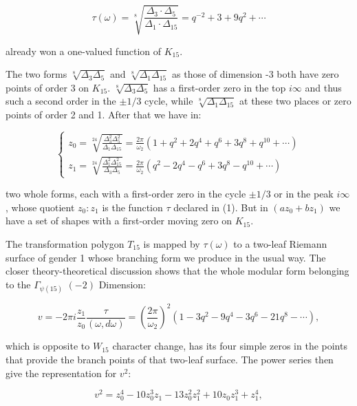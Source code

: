 \documentclass{article}
\begin{document}
\begin{equation}\label{1}
	\tau(\omega)=\sqrt[8]{\frac{\Delta_3\cdot\Delta_5}{\Delta_1\cdot\Delta_{15}}}=q^{-2}+3+9q^2+\cdots
\end{equation}

already won a one-valued function of $K_{15}$. 

The two forms $\sqrt[8]{\Delta_3\Delta_5}$ and $\sqrt[8]{\Delta_1\Delta_{15}}$ as those of dimension -3 both have zero points of order 3 on $K_{15}$. $\sqrt[8]{\Delta_3\Delta_5} $ has a first-order zero in the top $i\infty$ and thus such a second order in the $\pm1/3$ cycle, while $\sqrt[8]{\Delta_1\Delta_{15}}$ at these two places or zero points of order 2 and 1. After that we have in:

\begin{equation}\label{2}
	\begin{cases}
		z_0=\sqrt[24]{\frac{\Delta^2_3\Delta^2_5}{\Delta_1\Delta_{15}}}=\frac{2\pi}{\omega_2}(1+q^2+2q^4+q^6+3q^8+q^{10}+\cdots)\\
		z_1=\sqrt[24]{\frac{\Delta^2_1\Delta^2_{15}}{\Delta_3\Delta_{5}}}=\frac{2\pi}{\omega_2}(q^2-2q^4-q^6+3q^8-q^{10}+\cdots)
	\end{cases}
\end{equation}

two whole forms, each with a first-order zero in the cycle $\pm1/3$ or in the peak $i\infty $, whose quotient $z_0:z_1$ is the function $\tau $ declared in (1). But in $(az_0+bz_1)$ we have a set of shapes with a first-order moving zero on $K_{15}$. 

The transformation polygon $T_{15}$ is mapped by $\tau(\omega)$ to a two-leaf Riemann surface of gender 1 whose branching form we produce in the usual way. The closer theory-theoretical discussion shows that the whole modular form belonging to the $\Gamma_{\psi(15)}$ $(-2)$ Dimension:

\begin{equation}
	v=-2\pi i\frac{z_1}{z_0}\frac{\tau}{(\omega,d\omega)}=\left(\frac{2\pi}{\omega_2}\right)^2(1-3q^2-9q^4-3q^6-21q^8-\cdots),
\end{equation}

which is opposite to $W_ {15}$ character change, has its four simple zeros in the points that provide the branch points of that two-leaf surface. The power series then give the representation for $v^2$:

\begin{equation}
	v^2=z_0^4-10z_0^3z_1-13z_0^2z_1^2+10z_0z_1^3+z_1^4,
\end{equation}
\end{document}
